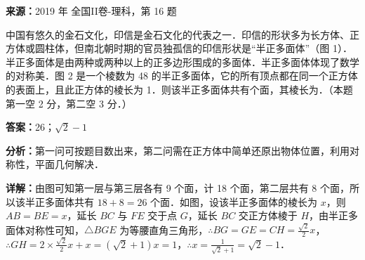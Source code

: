\begin{question}[points=5]
\textbf{来源：}2019 年 全国II卷-理科，第 16 题\par
中国有悠久的金石文化，印信是金石文化的代表之一．印信的形状多为长方体、正方体或圆柱体，但南北朝时期的官员独孤信的印信形状是“半正多面体”（图 1）．半正多面体是由两种或两种以上的正多边形围成的多面体．半正多面体体现了数学的对称美．图 2 是一个棱数为 48 的半正多面体，它的所有顶点都在同一个正方体的表面上，且此正方体的棱长为 1．则该半正多面体共有个面，其棱长为．（本题第一空 2 分，第二空 3 分．）
\fillin[{26；$\sqrt{2}-1$}]
\begin{solution}
\textbf{答案：}26；$\sqrt{2}-1$

\textbf{分析：}第一问可按题目数出来，第二问需在正方体中简单还原出物体位置，利用对称性，平面几何解决．

\textbf{详解：}由图可知第一层与第三层各有 9 个面，计 18 个面，第二层共有 8 个面，所以该半正多面体共有 $18+8=26$ 个面．如图，设该半正多面体的棱长为 $x$，则 $AB=BE=x$，延长 $BC$ 与 $FE$ 交于点 $G$，延长 $BC$ 交正方体棱于 $H$，由半正多面体对称性可知，$\triangle BGE$ 为等腰直角三角形，$\therefore BG=GE=CH=\frac{\sqrt{2}}{2}x$，$\therefore GH=2\times\frac{\sqrt{2}}{2}x+x=(\sqrt{2}+1)x=1$，$\therefore x=\frac{1}{\sqrt{2}+1}=\sqrt{2}-1$．
\end{solution}
\end{question}

